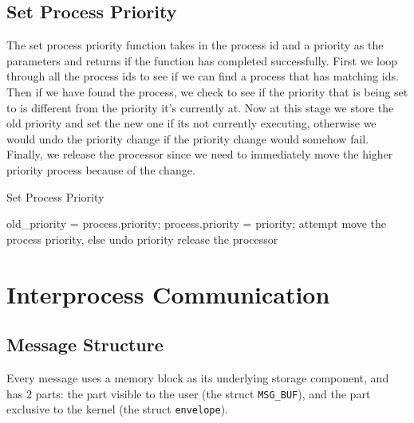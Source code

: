 \documentclass[12pt]{report}
\begin{document}
\subsection{Set Process Priority}

The set process priority function takes in the process id and a priority as the parameters and returns if the function has completed successfully. First we loop through all the process ids to see if we can find a process that has matching ids. Then if we have found the process, we check to see if the priority that is being set to is different from the priority it's currently at. Now at this stage we store the old priority and set the new one if its not currently executing, otherwise we would undo the priority change if the priority change would somehow fail. Finally, we release the processor since we need to immediately move the higher priority process because of the change.

\begin{algorithm}[H]
  \caption{Set Process Priority}
  \begin{algorithmic}[1]
            \State old_priority = process.priority;
            \State process.priority = priority;
              \State attempt move the process priority, else undo priority
            \EndIf     
            \State release the processor
          \EndIf
        \EndIf
      \EndFor
    \EndIf
  \EndFunction
  \end{algorithmic}
\end{algorithm}


\section{Interprocess Communication}

\subsection{Message Structure}

Every message uses a memory block as its underlying storage component, and has 2 parts: the part visible to the user (the struct \texttt{MSG_BUF}), and the part exclusive to the kernel (the struct \texttt{envelope}). 
\end{document}
